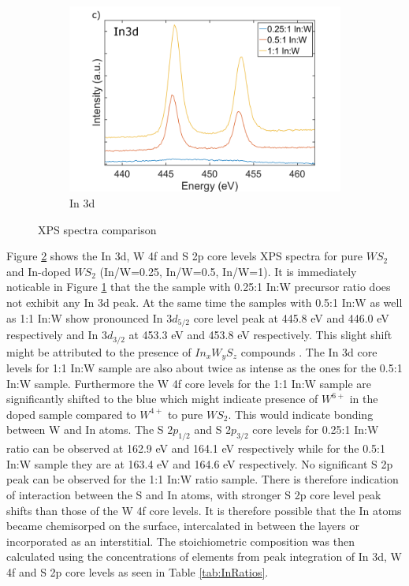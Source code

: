 \begin{figure}[H]
\begin{center}
\begin{subfigure}[b]{0.6\textwidth}
			\includegraphics[width=\textwidth]{In/XPSIn3d.png}
			\caption{In 3d}
			\label{fig:InXPSIn3d}
		\end{subfigure}
		\caption{XPS spectra comparison}
		\label{fig:InXPSSpectra}
	\end{center}
\end{figure}

Figure \ref{fig:InXPSSpectra} shows the In 3d, W 4f and S 2p core levels XPS spectra for pure $WS_2$ and In-doped $WS_2$ (In/W=0.25, In/W=0.5, In/W=1). It is immediately noticable in Figure \ref{fig:InXPSIn3d} that the the sample with 0.25:1 In:W precursor ratio does not exhibit any In 3d peak. At the same time the samples with 0.5:1 In:W as well as 1:1 In:W show pronounced In $3d_{5/2}$ core level peak at 445.8 eV and 446.0 eV respectively and In $3d_{3/2}$ at 453.3 eV and 453.8 eV respectively. This slight shift might be attributed to the presence of $In_xW_yS_z$ compounds \cite{Wagner1991}. The In 3d core levels for 1:1 In:W sample are also about twice as intense as the ones for the 0.5:1 In:W sample. Furthermore the W 4f core levels for the 1:1 In:W sample are significantly shifted to the blue which might indicate presence of $W^{6+}$ in the doped sample compared to $W^{4+}$ to pure $WS_2$. This would indicate bonding between W and In atoms. The S $2p_{1/2}$ and S $2p_{3/2}$ core levels for 0.25:1 In:W ratio can be observed at 162.9 eV and 164.1 eV respectively while for the 0.5:1 In:W sample they are at 163.4 eV and 164.6 eV respectively. No significant S 2p peak can be observed for the 1:1 In:W ratio sample. There is therefore indication of interaction between the S and In atoms, with stronger S 2p core level peak shifts than those of the W 4f core levels. It is therefore possible that the In atoms became chemisorped on the surface, intercalated in between the layers or incorporated as an interstitial. The stoichiometric composition was then calculated using the concentrations of elements from peak integration of In 3d, W 4f and S 2p core levels as seen in Table \ref{tab:InRatios}.

